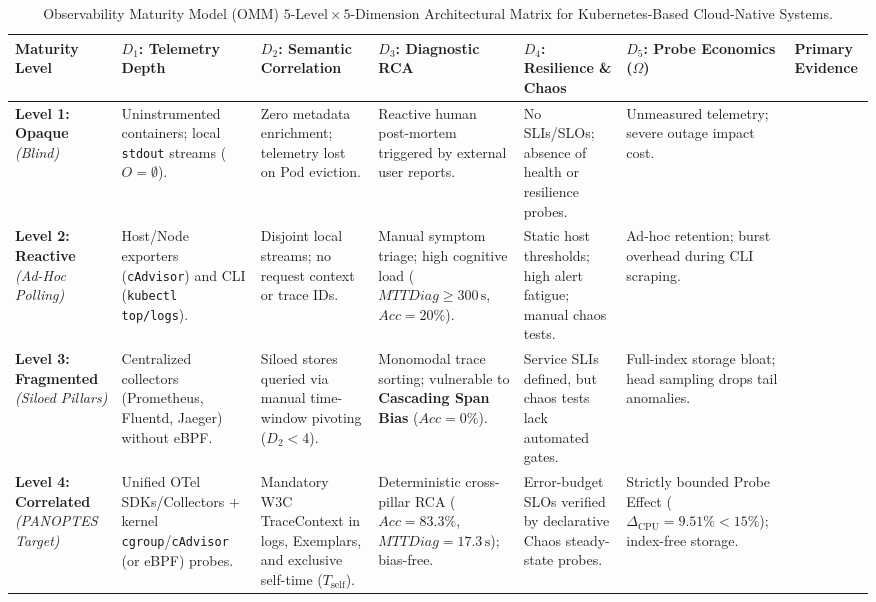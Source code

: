 \begin{table}[!ht]
\centering
\caption{Observability Maturity Model (OMM) $5\text{-Level} \times 5\text{-Dimension}$ Architectural Matrix for Kubernetes-Based Cloud-Native Systems.}
\label{tab:omm_architecture}
\fontsize{7.5}{9.0}\selectfont
\renewcommand{\arraystretch}{1.22}
\begin{tabularx}{\textwidth}{@{} p{2.0cm} X X X X X p{1.6cm} @{}}
\toprule
\textbf{Maturity Level} & \textbf{$D_1$: Telemetry Depth} & \textbf{$D_2$: Semantic Correlation} & \textbf{$D_3$: Diagnostic RCA} & \textbf{$D_4$: Resilience \& Chaos} & \textbf{$D_5$: Probe Economics ($\Omega$)} & \textbf{Primary Evidence} \\
\midrule
\textbf{Level 1: Opaque} \newline \textit{(Blind)} & Uninstrumented containers; local \texttt{stdout} streams ($O = \emptyset$). & Zero metadata enrichment; telemetry lost on Pod eviction. & Reactive human post-mortem triggered by external user reports. & No SLIs/SLOs; absence of health or resilience probes. & Unmeasured telemetry; severe outage impact cost. & \cite{kosinska_2023, usman_2022} \\
\addlinespace
\textbf{Level 2: Reactive} \newline \textit{(Ad-Hoc Polling)} & Host/Node exporters (\texttt{cAdvisor}) and CLI (\texttt{kubectl top/logs}). & Disjoint local streams; no request context or trace IDs. & Manual symptom triage; high cognitive load ($MTTDiag \ge 300\,\text{s}$, $Acc = 20\%$). & Static host thresholds; high alert fatigue; manual chaos tests. & Ad-hoc retention; burst overhead during CLI scraping. & \cite{zanatta_23, faseeha_2025, usman_2022} \\
\addlinespace
\textbf{Level 3: Fragmented} \newline \textit{(Siloed Pillars)} & Centralized collectors (Prometheus, Fluentd, Jaeger) without eBPF. & Siloed stores queried via manual time-window pivoting ($D_2 < 4$). & Monomodal trace sorting; vulnerable to \textbf{Cascading Span Bias} ($Acc = 0\%$). & Service SLIs defined, but chaos tests lack automated gates. & Full-index storage bloat; head sampling drops tail anomalies. & \cite{araujo_2024, hartikainen_2024, wei_2025, patel_2025} \\
\addlinespace
\textbf{Level 4: Correlated} \newline \textit{(PANOPTES Target)} & Unified OTel SDKs/Collectors + kernel \texttt{cgroup}/\texttt{cAdvisor} (or eBPF) probes. & Mandatory W3C TraceContext in logs, Exemplars, and exclusive self-time ($T_{\text{self}}$). & Deterministic cross-pillar RCA ($Acc = 83.3\%$, $MTTDiag = 17.3\,\text{s}$); bias-free. & Error-budget SLOs verified by declarative Chaos steady-state probes. & Strictly bounded Probe Effect ($\Delta_{\text{CPU}} = 9.51\% < 15\%$); index-free storage. & \cite{faseeha_2025, gomes_2025, hartikainen_2024, kosinska_2023} \\

\end{tabularx}
\end{table}
